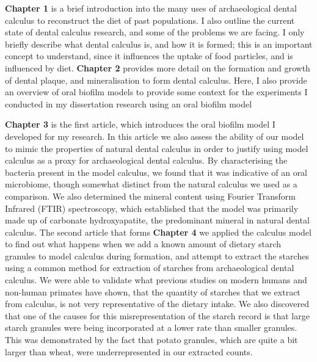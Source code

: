 \documentclass[
  letterpaper,
]{book}
\begin{document}
\textbf{Chapter 1} is a brief introduction into the many uses of
archaeological dental calculus to reconstruct the diet of past
populations. I also outline the current state of dental calculus
research, and some of the problems we are facing. I only briefly
describe what dental calculus is, and how it is formed; this is an
important concept to understand, since it influences the uptake of food
particles, and is influenced by diet. \textbf{Chapter 2} provides more
detail on the formation and growth of dental plaque, and mineralisation
to form dental calculus. Here, I also provide an overview of oral
biofilm models to provide some context for the experiments I conducted
in my dissertation research using an oral biofilm model

\textbf{Chapter 3} is the first article, which introduces the oral
biofilm model I developed for my research. In this article we also
assess the ability of our model to mimic the properties of natural
dental calculus in order to justify using model calculus as a proxy for
archaeological dental calculus. By characterising the bacteria present
in the model calculus, we found that it was indicative of an oral
microbiome, though somewhat distinct from the natural calculus we used
as a comparison. We also determined the mineral content using Fourier
Transform Infrared (FTIR) spectroscopy, which established that the model
was primarily made up of carbonate hydroxyapatite, the predominant
mineral in natural dental calculus. The second article that forms
\textbf{Chapter 4} we applied the calculus model to find out what
happens when we add a known amount of dietary starch granules to model
calculus during formation, and attempt to extract the starches using a
common method for extraction of starches from archaeological dental
calculus. We were able to validate what previous studies on modern
humans and non-human primates have shown, that the quantity of starches
that we extract from calculus, is not very representative of the dietary
intake. We also discovered that one of the causes for this
misrepresentation of the starch record is that large starch granules
were being incorporated at a lower rate than smaller granules. This was
demonstrated by the fact that potato granules, which are quite a bit
larger than wheat, were underrepresented in our extracted counts.
\end{document}
